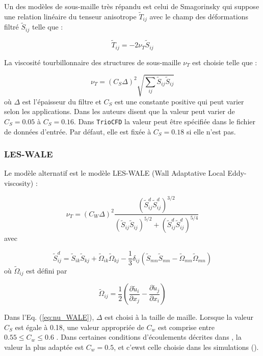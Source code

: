 Un des mod\`eles de sous-maille tr\`es r\'epandu est celui de Smagorinsky
qui suppose une relation lin\'eaire du tenseur anisotrope $\tilde{T}_{ij}$
avec le champ des d\'eformations filtr\'e $\tilde{S}_{ij}$ telle que
:

\[
\tilde{T}_{ij}=-2\nu_{T}\tilde{S}_{ij}
\]


La viscosit\'e tourbillonnaire des structures de sous-maille $\nu_{T}$
est choisie telle que :

\begin{equation}
\nu_{T}=(C_{S}\Delta)^{2}\sqrt{\sum_{ij}\tilde{S}_{ij}\tilde{S}_{ij}}\label{eq:nu_T_smago}
\end{equation}
o\`u $\Delta$ est l'\'epaisseur du filtre et $C_{S}$ est une constante
positive qui peut varier selon les applications. Dans \cite[p. 2203]{Weickert_etal_CAMWA2009}
les auteurs disent que la valeur peut varier de $C_{S}=0.05$ \`a $C_{S}=0.16$.
Dans \texttt{TrioCFD} la valeur peut \^etre sp\'ecifi\'ee dans le fichier
de donn\'ees d'entr\'ee. Par d\'efaut, elle est fix\'ee \`a $C_{S}=0.18$ si
elle n'est pas.


\subsubsection{LES-WALE}

Le mod\`ele alternatif est le mod\`ele LES-WALE (Wall Adaptative Local
Eddy-viscosity) \cite{Nicoud-Ducros_LES-WALE_FTC1999} :

\begin{equation}
\nu_{T}=(C_{W}\Delta)^{2}\frac{(\tilde{S}_{ij}^{d}\tilde{S}_{ij}^{d})^{3/2}}{(\tilde{S}_{ij}\tilde{S}_{ij})^{5/2}+(\tilde{S}_{ij}^{d}\tilde{S}_{ij}^{d})^{5/4}}\label{eq:nu_WALE}
\end{equation}
avec

\[
\tilde{S}_{ij}^{d}=\tilde{S}_{ik}\tilde{S}_{kj}+\tilde{\Omega}_{ik}\tilde{\Omega}_{kj}-\frac{1}{3}\delta_{ij}\left(\tilde{S}_{mn}\tilde{S}_{mn}-\tilde{\Omega}_{mn}\tilde{\Omega}_{mn}\right)
\]
o\`u $\tilde{\Omega}{}_{ij}$ est d\'efini par 

\[
\tilde{\Omega}_{ij}=\frac{1}{2}\left(\frac{\partial\tilde{u}_{i}}{\partial x_{j}}-\frac{\partial\tilde{u}_{j}}{\partial x_{i}}\right)
\]


Dans l'Eq. (\ref{eq:nu_WALE}), $\Delta$ est choisi \`a la taille de
maille. Lorsque la valeur $C_{S}$ est \'egale \`a 0.18, une valeur appropri\'ee
de $C_{w}$ est comprise entre $0.55\leq C_{w}\leq0.6$ \cite[p. 170]{Nicoud-Ducros_LES-WALE_FTC1999}.
Dans certaines conditions d'\'ecoulements d\'ecrites dans \cite[sec 3.1]{Nicoud-Ducros_LES-WALE_FTC1999},
la valeur la plus adapt\'ee est $C_{w}=0.5$, et c'ewst celle choisie
dans les simulations (\cite[pp. 191 and 192]{Nicoud-Ducros_LES-WALE_FTC1999}).


